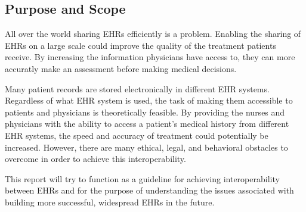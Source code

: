 \documentclass[14pt]{article}
\begin{document}


\subsection{Purpose and Scope}
All over the world sharing EHRs efficiently is a problem. Enabling the sharing of EHRs on a large scale could improve the quality of the treatment patients receive. By increasing the information physicians have access to, they can more accuratly make an assessment before making medical decisions.  

Many patient records are stored electronically in different EHR systems. Regardless of what EHR system is used, the task of making them accessible to patients and physicians is theoretically feasible. By providing the nurses and physicians with the ability to access a patient's medical history from different EHR systems, the speed and accuracy of treatment could potentially be increased. However, there are many ethical, legal, and behavioral obstacles to overcome in order to achieve this interoperability.


This report will try to function as a guideline for achieving interoperability between EHRs and for the purpose of understanding the issues associated with building more successful, widespread EHRs in the future. 
\end{document}
